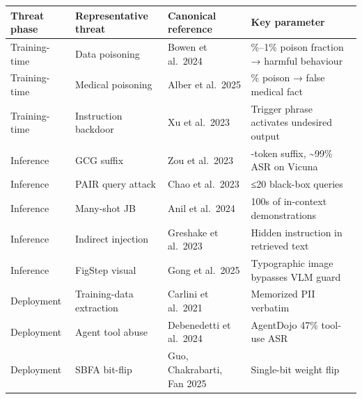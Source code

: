 {\def\LTcaptype{none} %
\begin{longtable}[]{@{}
  >{\raggedright\arraybackslash}p{}
  >{\raggedright\arraybackslash}p{}
  >{\raggedright\arraybackslash}p{}
  >{\raggedright\arraybackslash}p{}@{}}
\toprule\noalign{}
\begin{minipage}[b]{\linewidth}\raggedright
Threat phase
\end{minipage} & \begin{minipage}[b]{\linewidth}\raggedright
Representative threat
\end{minipage} & \begin{minipage}[b]{\linewidth}\raggedright
Canonical reference
\end{minipage} & \begin{minipage}[b]{\linewidth}\raggedright
Key parameter
\end{minipage} \\
\midrule\noalign{}
\endhead
\bottomrule\noalign{}
\endlastfoot
Training-time & Data poisoning & Bowen et al.~2024 & 0.1\%--1\% poison fraction → harmful behaviour \\
Training-time & Medical poisoning & Alber et al.~2025 & 0.001\% poison → false medical fact \\
Training-time & Instruction backdoor & Xu et al.~2023 & Trigger phrase activates undesired output \\
Inference & GCG suffix & Zou et al.~2023 & 20-token suffix, \textasciitilde99\% ASR on Vicuna \\
Inference & PAIR query attack & Chao et al.~2023 & ≤20 black-box queries \\
Inference & Many-shot JB & Anil et al.~2024 & 100s of in-context demonstrations \\
Inference & Indirect injection & Greshake et al.~2023 & Hidden instruction in retrieved text \\
Inference & FigStep visual & Gong et al.~2025 & Typographic image bypasses VLM guard \\
Deployment & Training-data extraction & Carlini et al.~2021 & Memorized PII verbatim \\
Deployment & Agent tool abuse & Debenedetti et al.~2024 & AgentDojo 47\% tool-use ASR \\
Deployment & SBFA bit-flip & Guo, Chakrabarti, Fan 2025 & Single-bit weight flip \\
\end{longtable}
}

